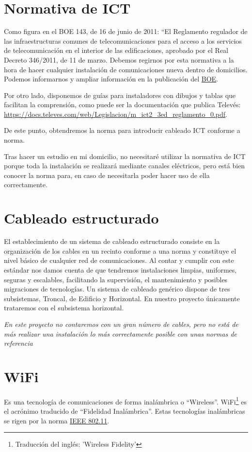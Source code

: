 \section{Normativa de ICT}
Como figura en el BOE 143, de 16 de junio de 2011: “El Reglamento regulador de las infraestructuras comunes de telecomunicaciones para el acceso a los servicios de telecomunicación en el interior de las edificaciones, aprobado por el Real Decreto 346/2011, de 11 de marzo.
Debemos regirnos por esta normativa a la hora de hacer cualquier instalación de comunicaciones nueva dentro de domicilios.
Podemos informarnos y ampliar información en la publicación del \href{https://www.boe.es/buscar/pdf/2011/BOE-A-2011-10457-consolidado.pdf}{BOE}.

Por otro lado, disponemos de guías para instaladores con dibujos y tablas que facilitan la comprensión, como puede ser la documentación que publica Televés:
\href{https://docs.televes.com/web/Legislacion/m_ict2_3ed_reglamento_0.pdf}{https://docs.televes.com/web/Legislacion/m_ict2_3ed_reglamento_0.pdf}.

De este punto, obtendremos la norma para introducir cableado ICT conforme a norma.

Tras hacer un estudio en mi domicilio, no necesitaré utilizar la normativa de ICT porque toda la instalación se realizará mediante canales eléctricos, pero está bien conocer la norma para, en caso de necesitarla poder hacer uso de ella correctamente.

\section{Cableado estructurado}
El establecimiento de un sistema de cableado estructurado consiste en la organización de los cables en un recinto conforme a una norma y constituye el nivel básico de cualquier red de comunicaciones.
Al contar y cumplir con este estándar nos damos cuenta de que tendremos instalaciones limpias, uniformes, seguras y escalables, facilitando la supervisión, el mantenimiento y posibles migraciones de tecnologías.
Un sistema de cableado genérico dispone de tres subsistemas, Troncal, de Edificio y Horizontal. En nuestro proyecto únicamente trataremos con el subsistema horizontal.

\emph{En este proyecto no contaremos con un gran número de cables, pero no está de más realizar una instalación lo más correctamente posible con unas normas de referencia}

\section{WiFi}
Es una tecnología de comunicaciones de forma inalámbrica o “Wireless”. WiFi\footnote{Traducción del inglés: 'Wireless Fidelity'} es el acrónimo traducido de “Fidelidad Inalámbrica”.
Estas tecnologías inalámbricas se rigen por la norma \underline{IEEE 802.11}.

